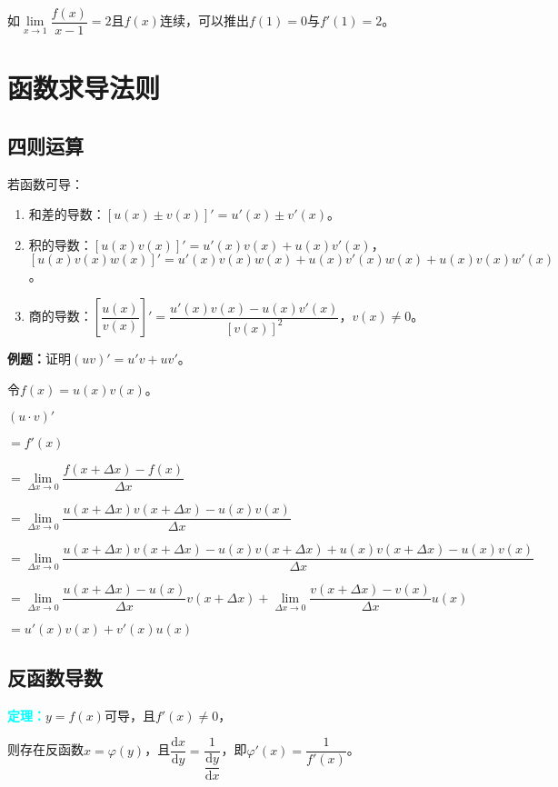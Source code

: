 \documentclass[UTF8, 12pt]{ctexart}
\begin{document}
如$\lim\limits_{x\to 1}\dfrac{f(x)}{x-1}=2$且$f(x)$连续，可以推出$f(1)=0$与$f'(1)=2$。

\section{函数求导法则}

\subsection{四则运算}

若函数可导：

\begin{enumerate}
    \item 和差的导数：$[u(x)\pm v(x)]'=u'(x)\pm v'(x)$。
    \item 积的导数：$[u(x)v(x)]'=u'(x)v(x)+u(x)v'(x)$，\\ $[u(x)v(x)w(x)]'=u'(x)v(x)w(x)+u(x)v'(x)w(x)+u(x)v(x)w'(x)$。
    \item 商的导数：$\left[\dfrac{u(x)}{v(x)}\right]'=\dfrac{u'(x)v(x)-u(x)v'(x)}{[v(x)]^2}$，$v(x)\neq 0$。
\end{enumerate}

\textbf{例题：}证明$(uv)'=u'v+uv'$。

令$f(x)=u(x)v(x)$。

$(u\cdot v)'$

$=f'(x)$

$=\lim\limits_{\Delta x\to 0}\dfrac{f(x+\Delta x)-f(x)}{\Delta x}$

$=\lim\limits_{\Delta x\to 0}\dfrac{u(x+\Delta x)v(x+\Delta x)-u(x)v(x)}{\Delta x}$

$=\lim\limits_{\Delta x\to 0}\dfrac{u(x+\Delta x)v(x+\Delta x)-u(x)v(x+\Delta x)+u(x)v(x+\Delta x)-u(x)v(x)}{\Delta x}$

$=\lim\limits_{\Delta x\to 0}\dfrac{u(x+\Delta x)-u(x)}{\Delta x}v(x+\Delta x) +\lim\limits_{\Delta x\to 0}\dfrac{v(x+\Delta x)-v(x)}{\Delta x}u(x)$

$=u'(x)v(x)+v'(x)u(x)$

\subsection{反函数导数}

\textcolor{aqua}{\textbf{定理：}}$y=f(x)$可导，且$f'(x)\neq 0$，

则存在反函数$x=\varphi(y)$，且$\dfrac{\textrm{d}x}{\textrm{d}y}=\dfrac{1}{\dfrac{\textrm{d}y}{\textrm{d}x}}$，即$\varphi'(x)=\dfrac{1}{f'(x)}$。\medskip
\end{document}
